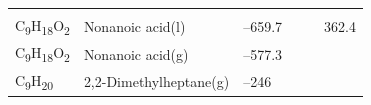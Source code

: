 \documentclass[
  9pt,
]{extbook}
\theoremstyle{definition}
\theoremstyle{definition}
\theoremstyle{definition}
\theoremstyle{remark}
\begin{document}
\begin{longtable}[]{@{}llllll@{}}
\begin{minipage}[t]{0.14\columnwidth}
\strut
\end{minipage}\tabularnewline
\begin{minipage}[t]{0.07\columnwidth}\raggedright
C\textsubscript{9}H\textsubscript{18}O\textsubscript{2}\strut
\end{minipage} & \begin{minipage}[t]{0.17\columnwidth}\raggedright
Nonanoic acid(l)\strut
\end{minipage} & \begin{minipage}[t]{0.15\columnwidth}\raggedright
--659.7\strut
\end{minipage} & \begin{minipage}[t]{0.15\columnwidth}\raggedright
\strut
\end{minipage} & \begin{minipage}[t]{0.14\columnwidth}\raggedright
\strut
\end{minipage} & \begin{minipage}[t]{0.14\columnwidth}\raggedright
362.4\strut
\end{minipage}\tabularnewline
\begin{minipage}[t]{0.07\columnwidth}\raggedright
C\textsubscript{9}H\textsubscript{18}O\textsubscript{2}\strut
\end{minipage} & \begin{minipage}[t]{0.17\columnwidth}\raggedright
Nonanoic acid(g)\strut
\end{minipage} & \begin{minipage}[t]{0.15\columnwidth}\raggedright
--577.3\strut
\end{minipage} & \begin{minipage}[t]{0.15\columnwidth}\raggedright
\strut
\end{minipage} & \begin{minipage}[t]{0.14\columnwidth}\raggedright
\strut
\end{minipage} & \begin{minipage}[t]{0.14\columnwidth}\raggedright
\strut
\end{minipage}\tabularnewline
\begin{minipage}[t]{0.07\columnwidth}\raggedright
C\textsubscript{9}H\textsubscript{20}\strut
\end{minipage} & \begin{minipage}[t]{0.17\columnwidth}\raggedright
2,2-Dimethylheptane(g)\strut
\end{minipage} & \begin{minipage}[t]{0.15\columnwidth}\raggedright
--246\strut
\end{minipage} & \begin{minipage}[t]{0.15\columnwidth}\raggedright

\end{minipage}
\end{longtable}
\end{document}
